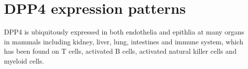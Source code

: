 \section{DPP4 expression patterns}
DPP4 is ubiquitously expressed in both endothelia and epithlia at many organs in mammals including kidney, liver, lung, intestines and immune system, which has been found on T cells, activated B cells, activated natural killer cells and myeloid cells.~\cite{Abbott1994,Shingu2003,Hong1989,Gutschmidt1981,Dikov2004,Bühling1995,Tanaka1992,Gorrell1991}